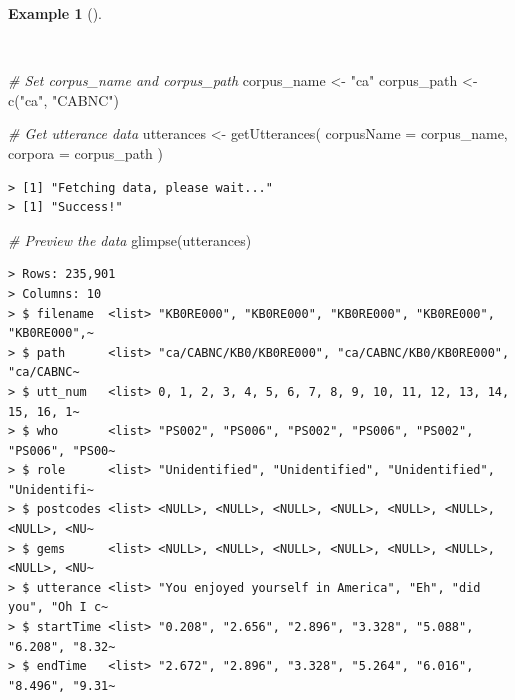\documentclass[
  letterpaper,
  DIV=11,
  numbers=noendperiod]{scrreprt}
\newenvironment{Shaded}{\begin{snugshade}}{\end{snugshade}}
\newcommand{\AttributeTok}[1]{\textcolor[rgb]{0.00,0.00,0.00}{#1}}
\newcommand{\CommentTok}[1]{\textcolor[rgb]{0.00,0.00,0.00}{\textit{#1}}}
\newcommand{\FunctionTok}[1]{\textcolor[rgb]{0.00,0.00,0.00}{#1}}
\newcommand{\NormalTok}[1]{\textcolor[rgb]{0.00,0.00,0.00}{#1}}
\newcommand{\OtherTok}[1]{\textcolor[rgb]{0.00,0.00,0.00}{#1}}
\newcommand{\StringTok}[1]{\textcolor[rgb]{0.00,0.00,0.00}{#1}}
\theoremstyle{definition}
\newtheorem{example}{Example}[chapter]
\theoremstyle{remark}
\begin{document}
\begin{example}[]\protect\hypertarget{exm-ad-get-utterances}{}\label{exm-ad-get-utterances}

~

\begin{Shaded}
\begin{Highlighting}[]
\CommentTok{\# Set corpus\_name and corpus\_path}
\NormalTok{corpus\_name }\OtherTok{\textless{}{-}} \StringTok{"ca"}
\NormalTok{corpus\_path }\OtherTok{\textless{}{-}} \FunctionTok{c}\NormalTok{(}\StringTok{"ca"}\NormalTok{, }\StringTok{"CABNC"}\NormalTok{)}

\CommentTok{\# Get utterance data}
\NormalTok{utterances }\OtherTok{\textless{}{-}}
  \FunctionTok{getUtterances}\NormalTok{(}
    \AttributeTok{corpusName =}\NormalTok{ corpus\_name,}
    \AttributeTok{corpora =}\NormalTok{ corpus\_path}
\NormalTok{    )}
\end{Highlighting}
\end{Shaded}

\begin{verbatim}
> [1] "Fetching data, please wait..."
> [1] "Success!"
\end{verbatim}

\begin{Shaded}
\begin{Highlighting}[]
\CommentTok{\# Preview the data}
\FunctionTok{glimpse}\NormalTok{(utterances)}
\end{Highlighting}
\end{Shaded}

\begin{verbatim}
> Rows: 235,901
> Columns: 10
> $ filename  <list> "KB0RE000", "KB0RE000", "KB0RE000", "KB0RE000", "KB0RE000",~
> $ path      <list> "ca/CABNC/KB0/KB0RE000", "ca/CABNC/KB0/KB0RE000", "ca/CABNC~
> $ utt_num   <list> 0, 1, 2, 3, 4, 5, 6, 7, 8, 9, 10, 11, 12, 13, 14, 15, 16, 1~
> $ who       <list> "PS002", "PS006", "PS002", "PS006", "PS002", "PS006", "PS00~
> $ role      <list> "Unidentified", "Unidentified", "Unidentified", "Unidentifi~
> $ postcodes <list> <NULL>, <NULL>, <NULL>, <NULL>, <NULL>, <NULL>, <NULL>, <NU~
> $ gems      <list> <NULL>, <NULL>, <NULL>, <NULL>, <NULL>, <NULL>, <NULL>, <NU~
> $ utterance <list> "You enjoyed yourself in America", "Eh", "did you", "Oh I c~
> $ startTime <list> "0.208", "2.656", "2.896", "3.328", "5.088", "6.208", "8.32~
> $ endTime   <list> "2.672", "2.896", "3.328", "5.264", "6.016", "8.496", "9.31~
\end{verbatim}

\end{example}
\end{document}
